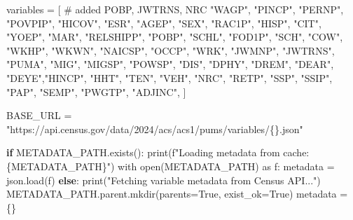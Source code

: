 \documentclass[
  letterpaper,
  DIV=11,
  numbers=noendperiod]{scrartcl}
\newenvironment{Shaded}{\begin{snugshade}}{\end{snugshade}}
\newcommand{\AttributeTok}[1]{\textcolor[rgb]{0.40,0.45,0.13}{#1}}
\newcommand{\CommentTok}[1]{\textcolor[rgb]{0.37,0.37,0.37}{#1}}
\newcommand{\ControlFlowTok}[1]{\textcolor[rgb]{0.00,0.23,0.31}{\textbf{#1}}}
\newcommand{\FunctionTok}[1]{\textcolor[rgb]{0.28,0.35,0.67}{#1}}
\newcommand{\NormalTok}[1]{\textcolor[rgb]{0.00,0.23,0.31}{#1}}
\newcommand{\OtherTok}[1]{\textcolor[rgb]{0.00,0.23,0.31}{#1}}
\newcommand{\SpecialCharTok}[1]{\textcolor[rgb]{0.37,0.37,0.37}{#1}}
\newcommand{\StringTok}[1]{\textcolor[rgb]{0.13,0.47,0.30}{#1}}
\begin{document}
\begin{Shaded}
\begin{Highlighting}[]
\NormalTok{variables }\OtherTok{=}\NormalTok{ [ }\CommentTok{\# added POBP, JWTRNS, NRC}
    \StringTok{"WAGP"}\NormalTok{, }\StringTok{"PINCP"}\NormalTok{, }\StringTok{"PERNP"}\NormalTok{, }\StringTok{"POVPIP"}\NormalTok{, }\StringTok{"HICOV"}\NormalTok{, }\StringTok{"ESR"}\NormalTok{,}
    \StringTok{"AGEP"}\NormalTok{, }\StringTok{"SEX"}\NormalTok{, }\StringTok{"RAC1P"}\NormalTok{, }\StringTok{"HISP"}\NormalTok{, }\StringTok{"CIT"}\NormalTok{, }\StringTok{"YOEP"}\NormalTok{, }\StringTok{"MAR"}\NormalTok{, }\StringTok{"RELSHIPP"}\NormalTok{,}
    \StringTok{"POBP"}\NormalTok{, }\StringTok{"SCHL"}\NormalTok{, }\StringTok{"FOD1P"}\NormalTok{, }\StringTok{"SCH"}\NormalTok{, }\StringTok{"COW"}\NormalTok{, }\StringTok{"WKHP"}\NormalTok{, }\StringTok{"WKWN"}\NormalTok{, }\StringTok{"NAICSP"}\NormalTok{, }\StringTok{"OCCP"}\NormalTok{, }
    \StringTok{"WRK"}\NormalTok{, }\StringTok{"JWMNP"}\NormalTok{, }\StringTok{"JWTRNS"}\NormalTok{, }\StringTok{"PUMA"}\NormalTok{, }\StringTok{"MIG"}\NormalTok{, }\StringTok{"MIGSP"}\NormalTok{, }\StringTok{"POWSP"}\NormalTok{,}
    \StringTok{"DIS"}\NormalTok{, }\StringTok{"DPHY"}\NormalTok{, }\StringTok{"DREM"}\NormalTok{, }\StringTok{"DEAR"}\NormalTok{, }\StringTok{"DEYE"}\NormalTok{,}\StringTok{"HINCP"}\NormalTok{, }\StringTok{"HHT"}\NormalTok{, }\StringTok{"TEN"}\NormalTok{, }\StringTok{"VEH"}\NormalTok{,}
    \StringTok{"NRC"}\NormalTok{, }\StringTok{"RETP"}\NormalTok{, }\StringTok{"SSP"}\NormalTok{, }\StringTok{"SSIP"}\NormalTok{, }\StringTok{"PAP"}\NormalTok{, }\StringTok{"SEMP"}\NormalTok{,}
    \StringTok{"PWGTP"}\NormalTok{, }\StringTok{"ADJINC"}\NormalTok{,}
\NormalTok{]}

\NormalTok{BASE\_URL }\OtherTok{=} \StringTok{"https://api.census.gov/data/2024/acs/acs1/pums/variables/\{\}.json"}

\ControlFlowTok{if} \FunctionTok{METADATA\_PATH.exists}\NormalTok{()}\SpecialCharTok{:}
    \FunctionTok{print}\NormalTok{(f}\StringTok{"Loading metadata from cache: \{METADATA\_PATH\}"}\NormalTok{)}
\NormalTok{    with }\FunctionTok{open}\NormalTok{(METADATA\_PATH) as f}\SpecialCharTok{:}
\NormalTok{        metadata }\OtherTok{=} \FunctionTok{json.load}\NormalTok{(f)}
\ControlFlowTok{else}\SpecialCharTok{:}
    \FunctionTok{print}\NormalTok{(}\StringTok{"Fetching variable metadata from Census API..."}\NormalTok{)}
    \FunctionTok{METADATA\_PATH.parent.mkdir}\NormalTok{(}\AttributeTok{parents=}\NormalTok{True, }\AttributeTok{exist\_ok=}\NormalTok{True)}
\NormalTok{    metadata }\OtherTok{=}\NormalTok{ \{\}}


\end{Highlighting}
\end{Shaded}
\end{document}
